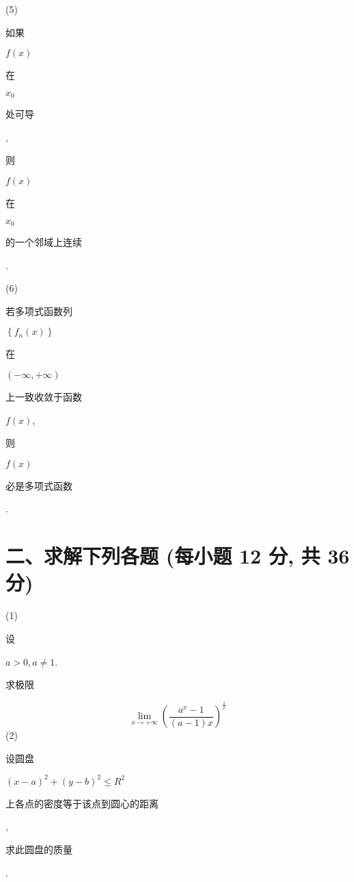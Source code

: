 \documentclass[10pt]{article}
\begin{document}
(5) \begin{CJK}{UTF8}{mj}如果\end{CJK} $f(x)$ \begin{CJK}{UTF8}{mj}在\end{CJK} $x_{0}$ \begin{CJK}{UTF8}{mj}处可导\end{CJK}, \begin{CJK}{UTF8}{mj}则\end{CJK} $f(x)$ \begin{CJK}{UTF8}{mj}在\end{CJK} $x_{0}$ \begin{CJK}{UTF8}{mj}的一个邻域上连续\end{CJK}.

(6) \begin{CJK}{UTF8}{mj}若多项式函数列\end{CJK} $\left\{f_{n}(x)\right\}$ \begin{CJK}{UTF8}{mj}在\end{CJK} $(-\infty,+\infty)$ \begin{CJK}{UTF8}{mj}上一致收敛于函数\end{CJK} $f(x)$, \begin{CJK}{UTF8}{mj}则\end{CJK} $f(x)$ \begin{CJK}{UTF8}{mj}必是多项式函数\end{CJK}.

\section{二、求解下列各题 (每小题 12 分, 共 36 分)}
(1) \begin{CJK}{UTF8}{mj}设\end{CJK} $a>0, a \neq 1$. \begin{CJK}{UTF8}{mj}求极限\end{CJK}
$$
\lim _{x \rightarrow+\infty}\left(\frac{a^{x}-1}{(a-1) x}\right)^{\frac{1}{x}}
$$
(2) \begin{CJK}{UTF8}{mj}设圆盘\end{CJK} $(x-a)^{2}+(y-b)^{2} \leqslant R^{2}$ \begin{CJK}{UTF8}{mj}上各点的密度等于该点到圆心的距离\end{CJK}, \begin{CJK}{UTF8}{mj}求此圆盘的质量\end{CJK}.
\end{document}
